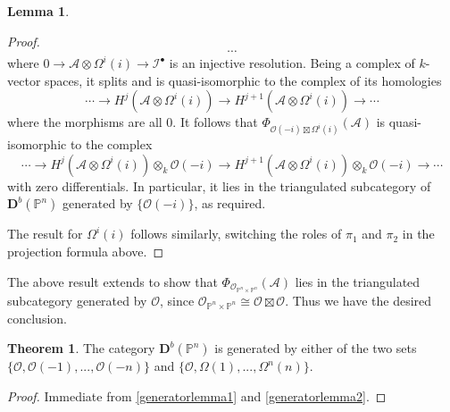 \documentclass[a4paper]{article}
\theoremstyle{definition}
\newtheorem{theorem}[defn]{Theorem}
\newtheorem{lemma}[defn]{Lemma}
\theoremstyle{remark}
\newcommand{\deri}{\mathbf{D}}
\newcommand{\Pn}{\ensuremath{{\mathbb{P}^n}}}
\begin{document}
\begin{lemma}
\begin{proof}
\[            \cdots\]
        where \(0\rightarrow \mathscr{A}\otimes \Omega^i(i) \rightarrow
        \mathscr{I}^\bullet\) is an injective resolution. Being a complex of
        \(k\)-vector spaces, it splits and is quasi-isomorphic to the complex of
        its homologies
        \[\cdots \rightarrow H^j(\mathscr{A}\otimes \Omega^i(i)) \longrightarrow
        H^{j+1}(\mathscr{A}\otimes \Omega^i(i))\rightarrow \cdots\] 
        where the morphisms are all \(0\). It follows that
        \(\Phi_{\mathscr{O}(-i)\boxtimes \Omega^i(i)}(\mathscr{A})\) is
        quasi-isomorphic to the complex 
        \[\cdots \rightarrow H^j(\mathscr{A}\otimes \Omega^i(i))\otimes_k
        \mathscr{O}(-i) \longrightarrow H^{j+1}(\mathscr{A}\otimes
        \Omega^i(i))\otimes_k \mathscr{O}(-i) \rightarrow \cdots\] 
        with zero differentials. In particular, it lies in the triangulated
        subcategory of \(\deri^b(\Pn)\) generated by \(\{\mathscr{O}(-i)\}\), as
        required.

        The result for \(\Omega^i(i)\) follows similarly, switching the
        roles of \(\pi_1\) and \(\pi_2\) in the projection formula above.
    \end{proof}
\end{lemma}

The above result extends to show that \(\Phi_{\mathscr{O}_{\Pn\times
\Pn}}(\mathscr{A})\) lies in the triangulated subcategory generated by
\(\mathscr{O}\), since \(\mathscr{O}_{\Pn\times \Pn}\cong
\mathscr{O}\boxtimes \mathscr{O}\). Thus we have the desired conclusion.

\begin{theorem}\label{generators-of-dbcoh}
    The category \(\deri^b(\Pn)\) is generated by either of the two sets
    \(\{\mathscr{O}, \mathscr{O}(-1),...,\mathscr{O}(-n)\}\) and
    \(\{\mathscr{O},\Omega(1),...,\Omega^n(n)\}\).
    \begin{proof}
        Immediate from \cref{generatorlemma1} and \cref{generatorlemma2}.
    \end{proof}
\end{theorem}
\end{document}
